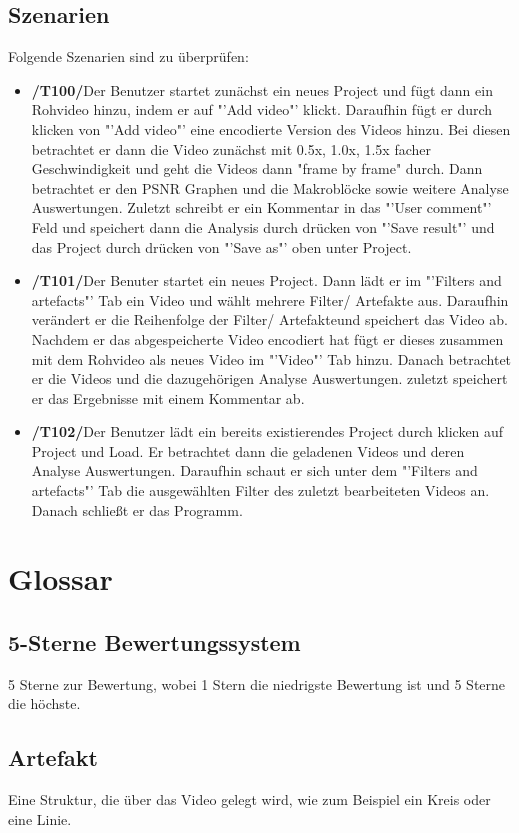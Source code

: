 \documentclass[parskip=full]{scrartcl}
\begin{document}
\subsection{Szenarien}
Folgende Szenarien sind zu überprüfen:
\begin{itemize}
\item[]\textbf{/T100/}\qquad Der Benutzer startet zunächst ein neues Project und fügt dann ein Rohvideo hinzu, indem er auf "'Add video"' klickt. Daraufhin fügt er durch klicken von "'Add video"' eine encodierte Version des Videos hinzu. Bei diesen betrachtet er dann die Video zunächst mit 0.5x, 1.0x, 1.5x facher Geschwindigkeit und geht die Videos dann "frame by frame" durch. Dann betrachtet er den PSNR Graphen und die Makroblöcke sowie weitere Analyse Auswertungen. Zuletzt schreibt er ein Kommentar in das "'User comment"' Feld und speichert dann die Analysis durch drücken von "'Save result"' und das Project durch drücken von "'Save as"' oben unter Project.
\item[]\textbf{/T101/}\qquad Der Benuter startet ein neues Project. Dann lädt er im "'Filters and artefacts"' Tab ein Video und wählt mehrere Filter/ Artefakte aus. Daraufhin verändert er die Reihenfolge der Filter/ Artefakteund speichert das Video ab. Nachdem er das abgespeicherte Video encodiert hat fügt er dieses zusammen mit dem Rohvideo als neues Video im "'Video"' Tab hinzu. Danach betrachtet er die Videos und die dazugehörigen Analyse Auswertungen. zuletzt speichert er das Ergebnisse mit einem Kommentar ab.
\item[]\textbf{/T102/}\qquad Der Benutzer lädt ein bereits existierendes Project durch klicken auf Project und Load. Er betrachtet dann die geladenen Videos und deren Analyse Auswertungen. Daraufhin schaut er sich unter dem "'Filters and artefacts"' Tab die ausgewählten Filter des zuletzt bearbeiteten Videos an. Danach schließt er das Programm.
\end{itemize}
\newpage
\section{Glossar}
\subsection*{5-Sterne Bewertungssystem}  
5 Sterne zur Bewertung, wobei 1 Stern die niedrigste Bewertung ist und 5 Sterne die höchste.

\subsection*{Artefakt} Eine Struktur, die über das Video gelegt wird, wie zum Beispiel ein Kreis oder eine Linie.
\end{document}
